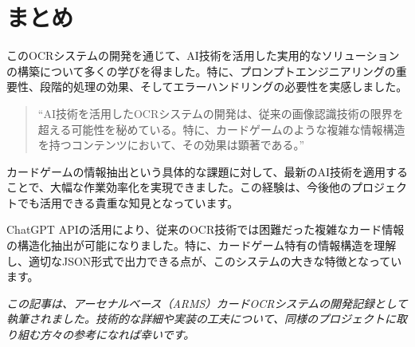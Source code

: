 \documentclass[a4paper,11pt]{jsarticle}
\begin{document}
\section*{まとめ}

このOCRシステムの開発を通じて、AI技術を活用した実用的なソリューションの構築について多くの学びを得ました。特に、プロンプトエンジニアリングの重要性、段階的処理の効果、そしてエラーハンドリングの必要性を実感しました。

\begin{quotation}
    ``AI技術を活用したOCRシステムの開発は、従来の画像認識技術の限界を超える可能性を秘めている。特に、カードゲームのような複雑な情報構造を持つコンテンツにおいて、その効果は顕著である。''
\end{quotation}

カードゲームの情報抽出という具体的な課題に対して、最新のAI技術を適用することで、大幅な作業効率化を実現できました。この経験は、今後他のプロジェクトでも活用できる貴重な知見となっています。

ChatGPT APIの活用により、従来のOCR技術では困難だった複雑なカード情報の構造化抽出が可能になりました。特に、カードゲーム特有の情報構造を理解し、適切なJSON形式で出力できる点が、このシステムの大きな特徴となっています。

\vspace{2em}

\begin{center}
\textit{この記事は、アーセナルベース（ARMS）カードOCRシステムの開発記録として執筆されました。技術的な詳細や実装の工夫について、同様のプロジェクトに取り組む方々の参考になれば幸いです。}
\end{center}
\end{document}
